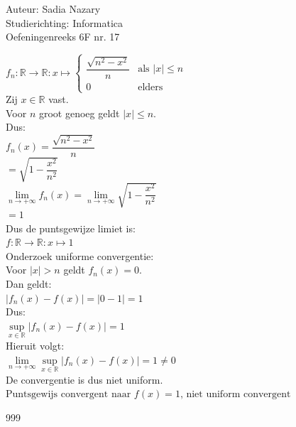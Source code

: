 \documentclass[a4paper]{article}
\begin{document}
\noindent \large Auteur: Sadia Nazary \\
\noindent \large Studierichting: Informatica\\
\noindent \large Oefeningenreeks 6F nr. 17\\

\medskip

\normalsize

$f_n:\mathbb{R}\longrightarrow\mathbb{R}:x\mapsto
\left\{
\begin{array}{ll}
\dfrac{\sqrt{n^2-x^2}}{n} & \text{als } |x|\leq n\\
0 & \text{elders}
\end{array}
\right.$\\

Zij $x\in\mathbb{R}$ vast.\\

Voor $n$ groot genoeg geldt $|x|\leq n$.\\

Dus:\\

$f_n(x)=\dfrac{\sqrt{n^2-x^2}}{n}$\\

$=\sqrt{1-\dfrac{x^2}{n^2}}$\\

$\lim\limits_{n\rightarrow+\infty}f_n(x)
=
\lim\limits_{n\rightarrow+\infty}
\sqrt{1-\dfrac{x^2}{n^2}}$\\

$=1$\\

Dus de puntsgewijze limiet is:\\

$f:\mathbb{R}\longrightarrow\mathbb{R}:x\mapsto 1$\\

Onderzoek uniforme convergentie:\\

Voor $|x|>n$ geldt $f_n(x)=0$.\\

Dan geldt:\\

$|f_n(x)-f(x)|=|0-1|=1$\\

Dus:\\

$\sup\limits_{x\in\mathbb{R}}|f_n(x)-f(x)|=1$\\

Hieruit volgt:\\

$\lim\limits_{n\rightarrow+\infty}
\sup\limits_{x\in\mathbb{R}}|f_n(x)-f(x)|=1\neq0$\\

De convergentie is dus niet uniform.\\

$\boxed{\text{Puntsgewijs convergent naar } f(x)=1 \text{, niet uniform convergent}}$

\begin{thebibliography}{999}
\end{thebibliography}
\end{document}

